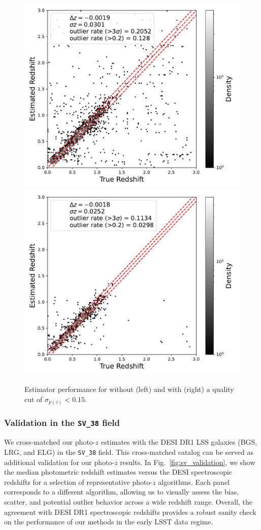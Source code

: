 \begin{figure}
    \centering
    \includegraphics[width=0.45\linewidth]{figures/tpz_scatter_orig.pdf}
    \includegraphics[width=0.45\linewidth]{figures/tpz_scatter_clean.pdf} \\
    \caption{Estimator performance for  without (left) and with (right) a quality cut of $\sigma_{p(z)} < 0.15$.}
    \label{fig:scatter_quality_cut}
\end{figure}


\subsubsection{Validation in the \texttt{SV\_38} field}

We cross-matched our photo-$z$ estimates with the DESI DR1 LSS galaxies (BGS, LRG, and ELG) in the \texttt{SV\_38} field. This cross-matched catalog can be served as additional validation for our photo-$z$ results. In Fig.~\ref{fig:sv_validation}, we show the median photometric redshift estimates versus the DESI spectroscopic redshifts for a selection of representative photo-$z$ algorithms. Each panel corresponds to a different algorithm, allowing us to visually assess the bias, scatter, and potential outlier behavior across a wide redshift range. Overall, the agreement with DESI DR1 spectroscopic redshifts provides a robust sanity check on the performance of our methods in the early LSST data regime.

